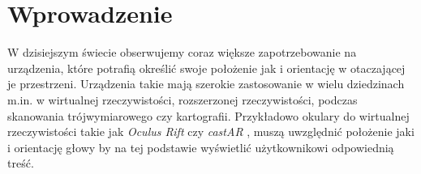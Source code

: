 
\chapter*{Wprowadzenie}

W dzisiejszym świecie obserwujemy coraz większe zapotrzebowanie na urządzenia,
które potrafią określić swoje położenie jak i orientację w otaczającej je przestrzeni.
Urządzenia takie mają szerokie zastosowanie w wielu dziedzinach m.in. w
wirtualnej rzeczywistości, rozszerzonej rzeczywistości, 
 podczas skanowania trójwymiarowego czy kartografii.
Przykładowo okulary do wirtualnej rzeczywistości takie jak \textit{Oculus Rift} \cite{bib:OculusRift} czy \textit{castAR} \cite{bib:castAR},
muszą uwzględnić położenie jaki i orientację głowy by na tej podstawie wyświetlić użytkownikowi 
odpowiednią treść. 


